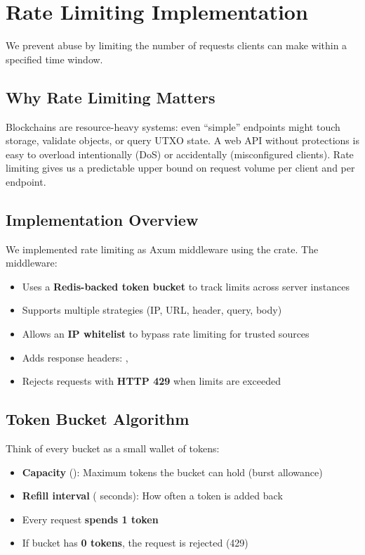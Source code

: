 \section{Rate Limiting Implementation}
\label{sec:rate-limiting}

We prevent abuse by limiting the number of requests clients can make within a specified time window.

\subsection{Why Rate Limiting Matters}

Blockchains are resource-heavy systems: even ``simple'' endpoints might touch storage, validate objects, or query UTXO state. A web API without protections is easy to overload intentionally (DoS) or accidentally (misconfigured clients). Rate limiting gives us a predictable upper bound on request volume per client and per endpoint.

\subsection{Implementation Overview}

We implemented rate limiting as Axum middleware using the  crate. The middleware:

\begin{itemize}
  \item Uses a \textbf{Redis-backed token bucket} to track limits across server instances
  \item Supports multiple strategies (IP, URL, header, query, body)
  \item Allows an \textbf{IP whitelist} to bypass rate limiting for trusted sources
  \item Adds response headers: , 
  \item Rejects requests with \textbf{HTTP 429} when limits are exceeded
\end{itemize}

\subsection{Token Bucket Algorithm}

Think of every bucket as a small wallet of tokens:

\begin{itemize}
  \item \textbf{Capacity} (): Maximum tokens the bucket can hold (burst allowance)
  \item \textbf{Refill interval} ( seconds): How often a token is added back
  \item Every request \textbf{spends 1 token}
  \item If bucket has \textbf{0 tokens}, the request is rejected (429)
\end{itemize}

